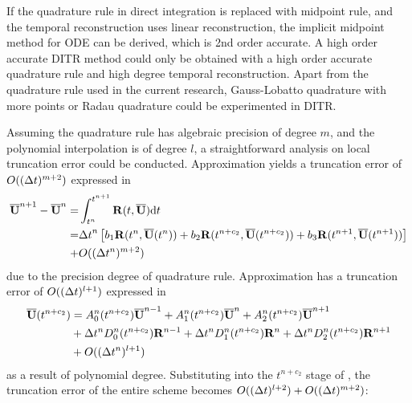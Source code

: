 If the quadrature rule in direct integration is replaced with
midpoint rule, and the temporal reconstruction uses linear
reconstruction, the implicit midpoint method for ODE can be derived,
which is 2nd order accurate. A high order accurate DITR method could
only be obtained with a high order accurate quadrature rule and
high degree temporal reconstruction.
Apart from the quadrature rule used in the current research, 
Gauss-Lobatto quadrature with more points or Radau quadrature
could be experimented in DITR.

Assuming the quadrature rule has algebraic precision
of degree $m$, and the polynomial interpolation is of degree $l$,
a straightforward analysis on local truncation error could be conducted.
Approximation  yields a
truncation error of $O(({\Delta} t)^{m+2} )$ expressed in 
\begin{equation}
    \label{eq:Quad3Err}
    \begin{aligned}
        \overline{\mathbf{U}}^{n+1} - \overline{\mathbf{U}}^{n} = & \int_{t^n}^{t^{n+1}}{
        \mathbf{R}(t, \overline{\mathbf{U}})\dd t}                              \\  = &
        {{\Delta} t}^{n}
        \left[
            b_1\mathbf{R}(t^n, \overline{\mathbf{U}}(t^n))
            +
            b_2\mathbf{R}(t^{n+c_2}, \overline{\mathbf{U}}(t^{n+c_2}))
            +
            b_3\mathbf{R}(t^{n+1}, \overline{\mathbf{U}}(t^{n+1}))
            \right]
        \\ + &
        O(({\Delta} t^{n})^{m+2} )
    \end{aligned}
\end{equation}
due to the precision degree of quadrature rule.
Approximation
 has a truncation error of $O(({\Delta} t)^{l+1})$
expressed in 
\begin{equation}
    \begin{aligned}
        \label{eq:TRErr}
        \overline{\mathbf{U}}(t^{n+c_2}) & =
        A^n_0(t^{n+c_2})\overline{\mathbf{U}}^{n - 1} +
        A^n_1(t^{n+c_2})\overline{\mathbf{U}}^{n} +
        A^n_2(t^{n+c_2})\overline{\mathbf{U}}^{n + 1}
        \\ & +
        {\Delta} t^n D^n_0(t^{n+c_2})\mathbf{R}^{n - 1} +
        {\Delta} t^n D^n_1(t^{n+c_2})\mathbf{R}^{n} +
        {\Delta} t^n D^n_2(t^{n+c_2})\mathbf{R}^{n + 1}
        \\ & +
        O(({\Delta} t^{n})^{l+1} )
    \end{aligned}
\end{equation}
as a result of polynomial degree.
Substituting  into the $t^{n+c_2}$ stage
of , the truncation error
of the entire scheme becomes $O(({\Delta} t)^{l+2}) + O(({\Delta} t)^{m+2})$:
